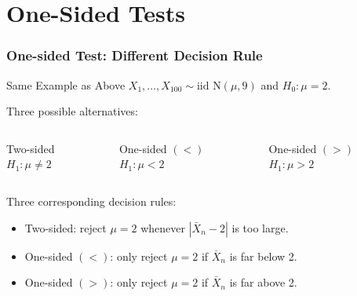 \section{One-Sided Tests}
\begin{frame}
  \frametitle{One-sided Test: Different Decision Rule} 

  \begin{block}{Same Example as Above}
  $X_1, \dots, X_{100}\sim \mbox{iid N}(\mu, 9)$ and $H_0\colon \mu=2$. 
\end{block}

\begin{alertblock}{Three possible alternatives:}

  \begin{columns}
    \begin{block}{Two-sided}
      $H_1\colon \mu \neq 2$
    \end{block}
    \begin{block}{One-sided $(<)$}
      $H_1\colon \mu < 2$
    \end{block}
    \begin{block}{One-sided $(>)$}
      $H_1\colon \mu > 2$
    \end{block}
  \end{columns}
\end{alertblock}

\vspace{1em}

\begin{block}{Three corresponding decision rules:}
  \begin{itemize}
    \item Two-sided: reject $\mu = 2$ whenever $|\bar{X}_n - 2|$ is too large.
    \item One-sided $(<)$: only reject $\mu = 2$ if $\bar{X}_n$ is far \alert{below} 2.
    \item One-sided $(>)$: only reject $\mu = 2$ if $\bar{X}_n$ is far \alert{above} 2.
  \end{itemize}
\end{block}
\end{frame}
